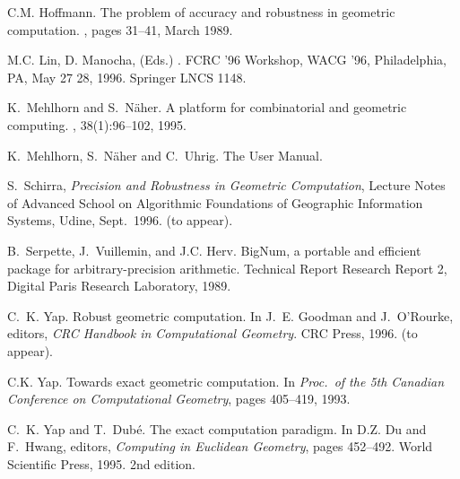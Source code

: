 {\begin{thebibliography}{AMC+}
C.M. Hoffmann.
\newblock The problem of accuracy and robustness in geometric computation.
, pages 31--41, March 1989.

M.C. Lin, D. Manocha, (Eds.) 
. 
FCRC '96 Workshop, WACG '96, Philadelphia, PA, May 27 28, 1996. 
Springer LNCS 1148.

K.~Mehlhorn and S.~N\"aher.
\newblock {}
A platform for combinatorial and geometric computing.
, 38(1):96--102, 1995.

K.~Mehlhorn, S.~N\"aher and C.~Uhrig.
\newblock The  User Manual.

S.~Schirra, {\em Precision and Robustness in Geometric Computation},
\newblock Lecture Notes of Advanced School on Algorithmic Foundations of
Geographic Information Systems, Udine, Sept.~1996. 
\newblock (to appear).

B.~Serpette, J.~Vuillemin, and J.C. Herv.
\newblock Big{N}um, a portable and efficient package for arbitrary-precision
  arithmetic.
\newblock Technical Report Research Report 2, Digital Paris Research
  Laboratory, 1989.

C.~K. Yap.
\newblock Robust geometric computation.
\newblock In J.~E. Goodman and J.~O'Rourke, editors, {\em CRC Handbook in
  Computational Geometry}. CRC Press, 1996.
\newblock (to appear).

C.K. Yap.
\newblock Towards exact geometric computation.
\newblock In {\em Proc.\ of the 5th Canadian Conference on Computational
  Geometry}, pages 405--419, 1993.

C.~K. Yap and T.~Dub{\protect \'e}.
\newblock The exact computation paradigm.
\newblock In D.Z. Du and F.~Hwang, editors, {\em Computing in {E}uclidean
  Geometry}, pages 452--492. World Scientific Press, 1995.
\newblock 2nd edition.

\end{thebibliography}
}
